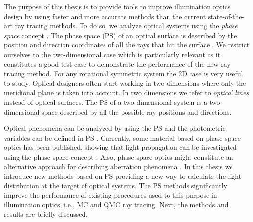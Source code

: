 The purpose of this thesis is to provide tools to improve illumination optics design by using faster and more accurate methods than the current state-of-the-art ray tracing methods.
To do so, we analyze optical systems using the \textit{phase space} concept \cite{torre2005linear}.
The phase space (PS) of an optical surface is described by the position and direction coordinates of all the rays that hit the surface \cite{testorf2009phase}. We restrict ourselves to the two-dimensional case which is particularly relevant as it constitutes a good test case to
demonstrate the performance of the new ray tracing method. For any rotational symmetric
system the 2D case is very useful to study. Optical designers often start working in two dimensions where only the
meridional plane is taken into account. In two dimensions we refer to \textit{optical lines} instead of optical surfaces. The PS of a two-dimensional system is a two-dimensional space described by all the possible ray positions and directions. 

Optical phenomena can be analyzed by using the PS and the photometric variables can be defined in PS \cite{rausch2014illumination}.  
Currently, some material based on phase space optics has been published, showing that light propagation can be investigated using the phase space concept \cite{rausch2012phase,rausch2014phase, herkommer2012phase}. Also, phase space optics might constitute an alternative approach for describing aberration phenomena \cite{herkommer2013phase, babington2017freeform, wolf1993relativistic}. In this thesis we introduce new methods based on PS providing a new way to calculate the light distribution at the target of optical systems. The PS methods significantly improve the performance of existing procedures used to this purpose in illumination optics, i.e., MC and QMC ray tracing. 
Next, the methods and results are briefly discussed. 

